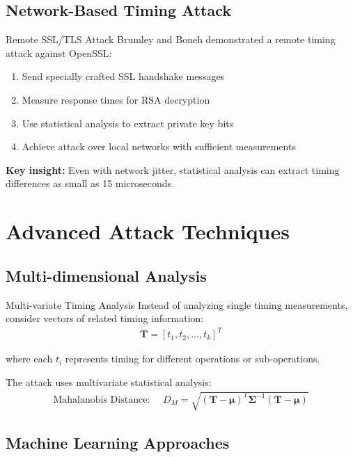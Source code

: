 \documentclass[12pt,a4paper]{article}
\theoremstyle{definition}
\begin{document}
\subsection{Network-Based Timing Attack}

\begin{examplebox}{Remote SSL/TLS Attack}
Brumley and Boneh demonstrated a remote timing attack against OpenSSL:

\begin{enumerate}
    \item Send specially crafted SSL handshake messages
    \item Measure response times for RSA decryption
    \item Use statistical analysis to extract private key bits
    \item Achieve attack over local networks with sufficient measurements
\end{enumerate}

\textbf{Key insight:} Even with network jitter, statistical analysis can extract timing differences as small as 15 microseconds.
\end{examplebox}

\section{Advanced Attack Techniques}

\subsection{Multi-dimensional Analysis}

\begin{definitionbox}{Multi-variate Timing Analysis}
Instead of analyzing single timing measurements, consider vectors of related timing information:
\begin{align}
\mathbf{T} = [t_1, t_2, \ldots, t_k]^T
\end{align}

where each $t_i$ represents timing for different operations or sub-operations.

The attack uses multivariate statistical analysis:
\begin{align}
\text{Mahalanobis Distance: } \quad D_M = \sqrt{(\mathbf{T} - \boldsymbol{\mu})^T \boldsymbol{\Sigma}^{-1} (\mathbf{T} - \boldsymbol{\mu})}
\end{align}
\end{definitionbox}

\subsection{Machine Learning Approaches}
\end{document}
